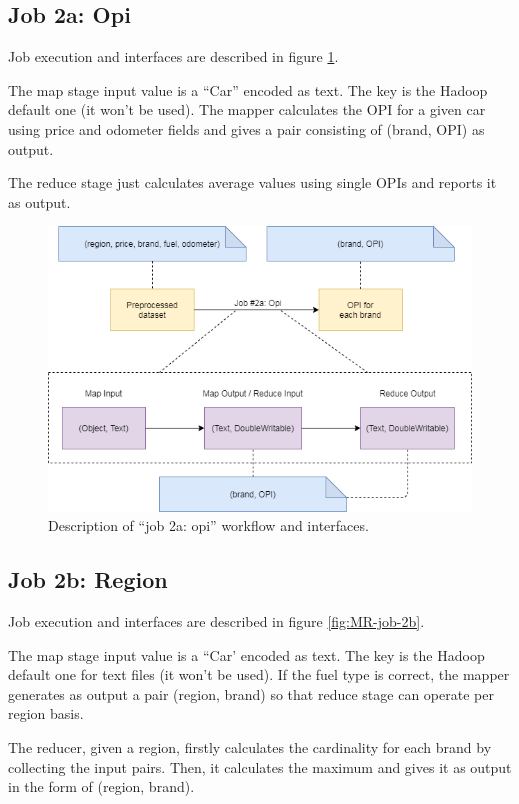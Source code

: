 \subsection{Job 2a: Opi}

Job execution and interfaces are described in figure \ref{fig:MR-job-2a}.

The map stage input value is a ``Car'' encoded as text. The key is the Hadoop default one (it won't be used). The mapper calculates the OPI for a given car using price and odometer fields and gives a pair consisting of (brand, OPI) as output.

The reduce stage just calculates average values using single OPIs and reports it as output.
   
\begin{figure}[H]
	\centering
	\includegraphics[scale=0.7]{images/2-mapreduce/MR-job-2a.png}
	\caption{Description of ``job 2a: opi'' workflow and interfaces.}
	\label{fig:MR-job-2a}
\end{figure}  

\subsection{Job 2b: Region}

Job execution and interfaces are described in figure \ref{fig:MR-job-2b}.

The map stage input value is a ``Car' encoded as text. The key is the Hadoop default one for text files (it won't be used). If the fuel type is correct, the mapper generates as output a pair (region, brand) so that reduce stage can operate per region basis.

The reducer, given a region, firstly calculates the cardinality for each brand by collecting the input pairs. Then, it calculates the maximum and gives it as output in the form of (region, brand).

